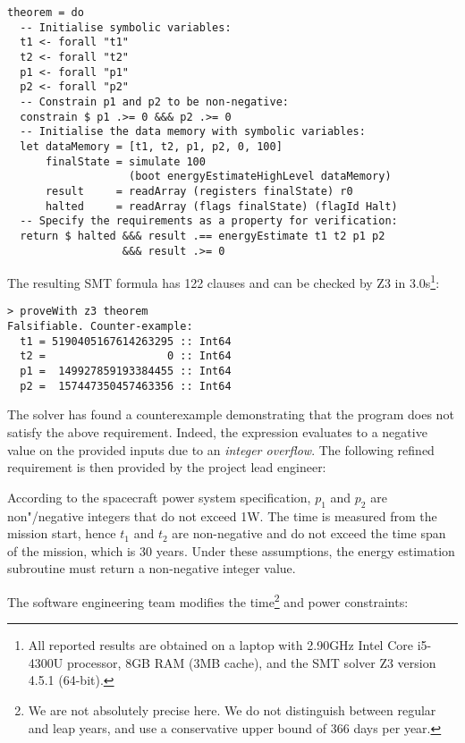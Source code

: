\begin{verbatim}
theorem = do
  -- Initialise symbolic variables:
  t1 <- forall "t1"
  t2 <- forall "t2"
  p1 <- forall "p1"
  p2 <- forall "p2"
  -- Constrain p1 and p2 to be non-negative:
  constrain $ p1 .>= 0 &&& p2 .>= 0
  -- Initialise the data memory with symbolic variables:
  let dataMemory = [t1, t2, p1, p2, 0, 100]
      finalState = simulate 100
                   (boot energyEstimateHighLevel dataMemory)
      result     = readArray (registers finalState) r0
      halted     = readArray (flags finalState) (flagId Halt)
  -- Specify the requirements as a property for verification:
  return $ halted &&& result .== energyEstimate t1 t2 p1 p2
                  &&& result .>= 0
\end{verbatim}

\noindent
The resulting SMT formula has 122 clauses and can be checked by Z3 in
3.0s\footnote{All reported results are obtained on a laptop with 2.90GHz Intel
Core i5-4300U processor, 8GB RAM (3MB cache), and the SMT solver Z3 version 4.5.1 (64-bit).}:


\begin{verbatim}
> proveWith z3 theorem
Falsifiable. Counter-example:
  t1 = 5190405167614263295 :: Int64
  t2 =                   0 :: Int64
  p1 =  149927859193384455 :: Int64
  p2 =  157447350457463356 :: Int64
\end{verbatim}


The solver has found a counterexample demonstrating that the program does not
satisfy the above requirement. Indeed, the expression evaluates to a negative
value on the provided inputs due to an \emph{integer overflow}. The following
refined requirement is then provided by the project lead engineer:


\begin{tcolorbox}

According to the spacecraft power system specification, $p_1$ and $p_2$ are
non"/negative integers that do not exceed 1W. The time is measured
from the mission start, hence $t_1$ and $t_2$ are non-negative and do not exceed
the time span of the mission, which is 30 years. Under these assumptions,
the energy estimation subroutine must return a non-negative integer value.

\end{tcolorbox}

\noindent
The software engineering team modifies the time\footnote{We are not absolutely
precise here. We do not distinguish between regular and leap years, and use
a conservative upper bound of 366 days per year.} and power constraints:


